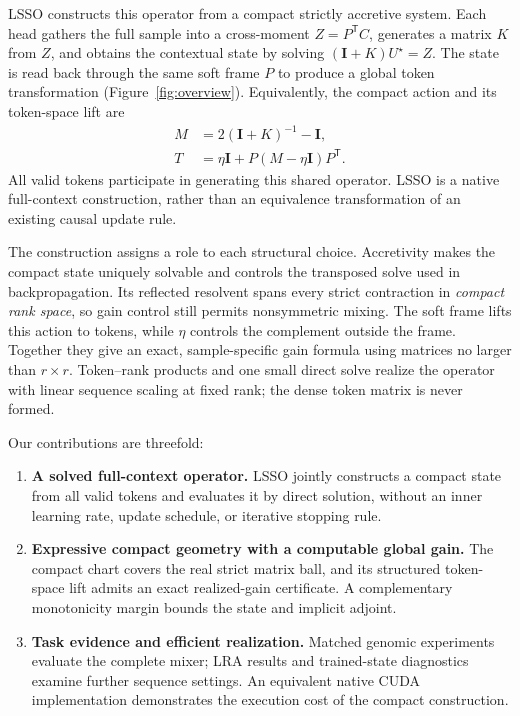 \documentclass[10pt]{article}
\newcommand{\I}{\mathbf{I}}
\newcommand{\T}{\mathsf{T}}
\begin{document}
LSSO constructs this operator from a compact strictly accretive system.  Each
head gathers the full sample into a cross-moment $Z=P^\T C$, generates a matrix
$K$ from $Z$, and obtains the contextual state by solving
$(\I+K)U^\star=Z$.  The state is read back through the same soft frame $P$ to
produce a global token transformation (Figure~\ref{fig:overview}).  Equivalently,
the compact action and its token-space lift are
\begin{align}
    M &= 2(\I+K)^{-1}-\I,
\label{eq:reflected-resolvent}\\
    T &= \eta\I+P(M-\eta\I)P^\T.
\label{eq:token-mixer-intro}
\end{align}
All valid tokens participate in generating this shared operator.  LSSO is a
native full-context construction, rather than an equivalence transformation of
an existing causal update rule.

The construction assigns a role to each structural choice.  Accretivity makes
the compact state uniquely solvable and controls the transposed solve used in
backpropagation.  Its reflected resolvent spans every strict contraction in
\emph{compact rank space}, so gain control still permits nonsymmetric mixing.
The soft frame lifts this action to tokens, while $\eta$ controls the complement
outside the frame.  Together they give an exact, sample-specific gain formula
using matrices no larger than $r\times r$.  Token--rank products and one small
direct solve realize the operator with linear sequence scaling at fixed rank;
the dense token matrix is never formed.

Our contributions are threefold:
\begin{enumerate}
    \item \textbf{A solved full-context operator.}  LSSO jointly constructs a
    compact state from all valid tokens and evaluates it by direct solution,
    without an inner learning rate, update schedule, or iterative stopping rule.
    \item \textbf{Expressive compact geometry with a computable global gain.}
    The compact chart covers the real strict matrix ball, and its structured
    token-space lift admits an exact realized-gain certificate.  A complementary
    monotonicity margin bounds the state and implicit adjoint.
    \item \textbf{Task evidence and efficient realization.}  Matched genomic
    experiments evaluate the complete mixer; LRA results and trained-state
    diagnostics examine further sequence settings.  An equivalent native CUDA
    implementation demonstrates the execution cost of the compact construction.
\end{enumerate}
\end{document}

